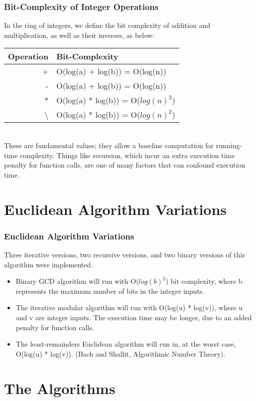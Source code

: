 \documentclass{beamer}
\begin{document}
\begin{frame}
\frametitle{Bit-Complexity of Integer Operations}
\indent In the ring of integers, we define the bit complexity of addition and multiplication, as well as their inverses, as below: \\ 
\begin{tabular}{|r|l|}
\hline
Operation & Bit-Complexity \\  \hline
+ & O(log(a) + log(b)) = O(log(n)) \\  \hline
- & O(log(a) + log(b)) = O(log(n)) \\ \hline
* & O(log(a) * log(b)) = O($log(n)^2$) \\ \hline
\textbackslash & O(log(a) * log(b)) = O($log(n)^2$) \\ \hline

\end{tabular} \\
\indent These are fundamental values; they allow a baseline computation for running-time complexity. Things like recursion, which incur an extra execution time penalty for function calls, are one of many factors that can confound execution time. \\
\end{frame}
\section{Euclidean Algorithm Variations}
\begin{frame}
\frametitle{Euclidean Algorithm Variations}
\indent Three iterative versions, two recursive versions, and two binary versions of this algorithm were implemented. 
\begin{itemize}
\item Binary GCD algorithm will run with O($log(b)^2$) bit complexity, where b represents the maximum number of bits in the integer inputs.
\item The iterative modular algorithm will run with O(log(u) * log(v)), where u and v are integer inputs. The execution time may be longer, due to an added penalty for function calls.
\item The least-remainders Euclidean algorithm will run in, at the worst case, O(log(u) * log(v)). (Bach and Shallit, Algorithmic Number Theory).
\end{itemize}
\end{frame}
\section{The Algorithms}
\end{document}
